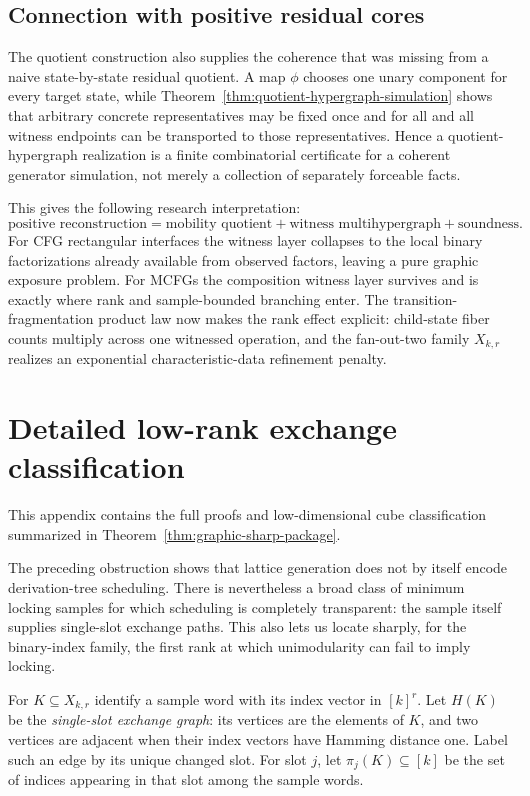 \documentclass[11pt]{article}
\begin{document}
\subsection{Connection with positive residual cores}

The quotient construction also supplies the coherence that was missing from a
naive state-by-state residual quotient.  A map $\phi$ chooses one unary
component for every target state, while
Theorem~\ref{thm:quotient-hypergraph-simulation} shows that arbitrary concrete
representatives may be fixed once and for all and all witness endpoints can be
transported to those representatives.  Hence a quotient-hypergraph realization
is a finite combinatorial certificate for a coherent generator simulation, not
merely a collection of separately forceable facts.

This gives the following research interpretation:
\[
\boxed{
\text{positive reconstruction}
=
\text{mobility quotient}
+
\text{witness multihypergraph}
+
\text{soundness}.
}
\]
For CFG rectangular interfaces the witness layer collapses to the local binary
factorizations already available from observed factors, leaving a pure graphic
exposure problem.  For MCFGs the composition witness layer survives and is
exactly where rank and sample-bounded branching enter.  The transition-fragmentation product law now makes the rank
effect explicit: child-state fiber counts multiply across one witnessed
operation, and the fan-out-two family $X_{k,r}$ realizes an exponential
characteristic-data refinement penalty.



\section{Detailed low-rank exchange classification}
\label{app:low-rank-threshold}
This appendix contains the full proofs and low-dimensional cube classification
summarized in Theorem~\ref{thm:graphic-sharp-package}.


The preceding obstruction shows that lattice generation does not by itself
encode derivation-tree scheduling.  There is nevertheless a broad class of
minimum locking samples for which scheduling is completely transparent: the
sample itself supplies single-slot exchange paths.  This also lets us locate
sharply, for the binary-index family, the first rank at which unimodularity can
fail to imply locking.

For $K\subseteq X_{k,r}$ identify a sample word with its index vector in
$[k]^r$.  Let $H(K)$ be the \emph{single-slot exchange graph}: its vertices are
the elements of $K$, and two vertices are adjacent when their index vectors
have Hamming distance one.  Label such an edge by its unique changed slot.
For slot $j$, let $\pi_j(K)\subseteq[k]$ be the set of indices appearing in
that slot among the sample words.
\end{document}
